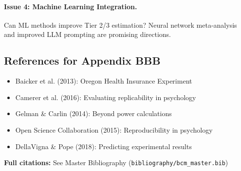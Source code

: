 \paragraph{Issue 4: Machine Learning Integration.}
Can ML methods improve Tier 2/3 estimation? Neural network meta-analysis
and improved LLM prompting are promising directions.


\subsection{References for Appendix BBB}
\label{sec:BBB-references}

\begin{itemize}[nosep]
    \item Baicker et al. (2013): Oregon Health Insurance Experiment
    \item Camerer et al. (2016): Evaluating replicability in psychology
    \item Gelman \& Carlin (2014): Beyond power calculations
    \item Open Science Collaboration (2015): Reproducibility in psychology
    \item DellaVigna \& Pope (2018): Predicting experimental results
\end{itemize}

\textbf{Full citations:} See Master Bibliography (\texttt{bibliography/bcm\_master.bib})


